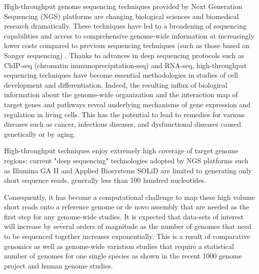 \documentclass{cpeauth}
\begin{document}
High-throughput genome sequencing techniques provided by Next
Generation Sequencing (NGS) platforms are changing biological sciences
and biomedical research dramatically\cite{mardis2008-tig,mardis2008-arghg}. These techniques have led to a
broadening of sequencing capabilities and access to comprehensive
genome-wide information at increasingly lower costs compared to
previous sequencing techniques (such as those based on Sanger
sequencing)
\cite{metzker2010,mardis2008-tig,mardis2008-arghg,gilad2009,mortazavi2008,sorek2010}.
Thanks to advances in deep sequencing protocols such as ChIP-seq (chromatin immunoprecipitation-seq)
 and RNA-seq, high-throughput
sequencing techniques have become essential methodologies in studies
of cell development and
differentiation\cite{wang2009-natrevgen,pepke2009,gilad2009,mortazavi2008,sorek2010}.
Indeed, the resulting influx of biological information about the
genome-wide organization and the interaction map of target genes and
pathways reveal underlying mechanisms of gene expression and
regulation in living cells. This has the potential to lead to
remedies for various diseases such as cancer, infectious diseases, and
dysfunctional diseases caused genetically or by
aging\cite{amaral2008,encode2007,baek2008,costa2009}.


High-throughput techniques enjoy extremely high coverage of target
genome regions; current "deep sequencing"
technologies adopted by NGS platforms such as Illumina GA II
and Applied Biosystems SOLiD are limited to generating only short
sequence reads, generally less than 100 hundred
nucleotides\cite{metzker2010}.

Consequently, it has become a computational challenge to map these
high volume short reads onto a reference genome or de novo assembly
that are needed as the first step for any genome-wide
studies\cite{alex2009,trapnell2009,scheibye-alsing2009,pop2002,hernandez2008,farrer2008}.
It is expected that data-sets of interest will increase by several
orders of magnitude as the number of genomes that need to be sequenced
together increases exponentially.  This is a result of comparative
genomics as well as genome-wide variation studies that require a
statistical number of genomes for one single species as shown in the
recent 1000 genome project and human genome
studies\cite{1000genome,mardis2008-tig,gilad2009,alex2009,kim2011}.

\end{document}
